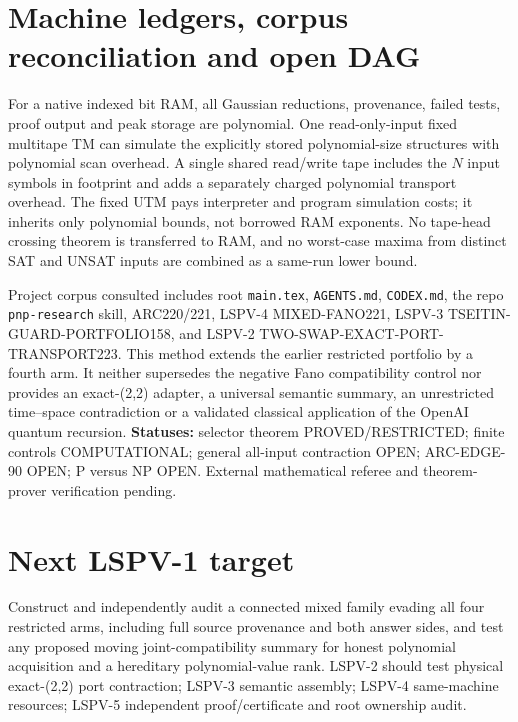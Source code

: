 \documentclass[11pt]{article}
\begin{document}
\section{Machine ledgers, corpus reconciliation and open DAG}
For a native indexed bit RAM, all Gaussian reductions, provenance,
failed tests, proof output and peak storage are polynomial.
One read-only-input fixed multitape TM can simulate the explicitly
stored polynomial-size structures with polynomial scan overhead.
A single shared read/write tape includes the $N$ input
symbols in footprint and adds a separately charged polynomial
transport overhead. The fixed UTM pays interpreter and program
simulation costs; it inherits only polynomial bounds, not borrowed
RAM exponents. No tape-head crossing theorem is transferred to
RAM, and no worst-case maxima from distinct SAT and UNSAT
inputs are combined as a same-run lower bound.

Project corpus consulted includes root \texttt{main.tex},
\texttt{AGENTS.md}, \texttt{CODEX.md}, the repo
\texttt{pnp-research} skill, ARC220/221, LSPV-4 MIXED-FANO221,
LSPV-3 TSEITIN-GUARD-PORTFOLIO158, and LSPV-2
TWO-SWAP-EXACT-PORT-TRANSPORT223. This method extends the
earlier restricted portfolio by a fourth arm. It neither
supersedes the negative Fano compatibility control nor
provides an exact-(2,2) adapter, a universal semantic summary,
an unrestricted time--space contradiction or a validated
classical application of the OpenAI quantum recursion.
\textbf{Statuses:} selector theorem PROVED/RESTRICTED;
finite controls COMPUTATIONAL; general all-input contraction
OPEN; ARC-EDGE-90 OPEN; P versus NP OPEN.
External mathematical referee and theorem-prover verification pending.
\section{Next LSPV-1 target}
Construct and independently audit a connected mixed family
evading all four restricted arms, including full source
provenance and both answer sides, and test any proposed
moving joint-compatibility summary for honest polynomial
acquisition and a hereditary polynomial-value rank.
LSPV-2 should test physical exact-(2,2) port contraction;
LSPV-3 semantic assembly; LSPV-4 same-machine resources;
LSPV-5 independent proof/certificate and root ownership audit.
\end{document}
